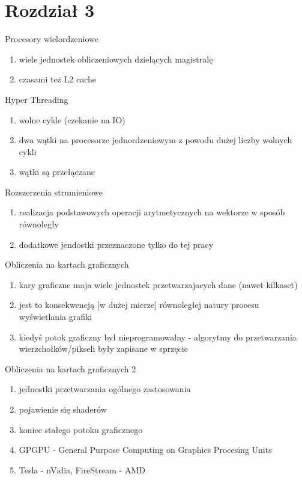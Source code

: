 \documentclass{beamer}
\begin{document}
\section{Rozdział 3}


\begin{frame}{Procesory wielordzeniowe}
  \begin{enumerate}
  \item wiele jednostek obliczeniowych dzielących magistralę
  \item czasami też L2 cache
  \end{enumerate}
\end{frame}

\begin{frame}{Hyper Threading}
  \begin{enumerate}
  \item wolne cykle (czekanie na IO)
  \item dwa wątki na procesorze jednordzeniowym z powodu dużej liczby wolnych cykli
  \item wątki są przełączane
  \end{enumerate}
\end{frame}

\begin{frame}{Rozszerzenia strumieniowe}
  \begin{enumerate}
  \item realizacja podstawowych operacji arytmetycznych na wektorze w sposób równoległy
  \item dodatkowe jendostki przeznaczone tylko do tej pracy
  \end{enumerate}
\end{frame}

\begin{frame}{Obliczenia na kartach graficznych}
  \begin{enumerate}
  \item kary graficzne maja wiele jednostek przetwarzajacych dane (nawet kilkaset)
  \item jest to konsekwencją [w dużej mierze] równoległej natury procesu wyświetlania grafiki
  \item kiedyś potok graficzny był nieprogramowalny - algorytmy do przetwarzania wierzchołków/pikseli były zapisane w sprzęcie
  \end{enumerate}
\end{frame}

\begin{frame}{Obliczenia na kartach graficznych 2}
  \begin{enumerate}
  \item jednostki przetwarzania ogólnego zastosowania
  \item pojawienie się shaderów
  \item koniec stałego potoku graficznego
  \item GPGPU - General Purpose Computing on Graphics Procesing Units
  \item Tesla - nVidia, FireStream - AMD
  \end{enumerate}
\end{frame}
\end{document}
